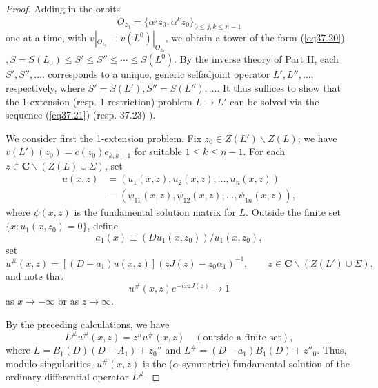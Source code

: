 \documentclass{surv-l}
\theoremstyle{plain}
\theoremstyle{definition}
\numberwithin{equation}{chapter}
\begin{document}
\begin{proof}
Adding in the orbits
\begin{equation*}
O_{z_{0}}=\{\alpha^{j}z_{0}, \alpha^{k}\overline{z}_{0}\}_{0\leq j,k\leq n-1}
\end{equation*}
one at a time, with $v|_{O_{z_{0}}}\equiv v(L^{0})|_{O_{z_{0}}}$, we obtain a tower of the form (\ref{eq37.20})$, S=S(L_{0})\leq S'\leq S''\leq\cdots \leq S(L^{0})$. By the inverse theory of Part II, each $S',S'',\ldots$. corresponds to a unique, generic selfadjoint operator $L',L'',\ldots,$ respectively, where $S'=S(L'),S''=S(L''),\ldots$. It thus suffices to show that the 1-extension (resp. 1-restriction) problem $L\rightarrow L'$ can be solved via the sequence (\ref{eq37.21}) (resp. 37.23) $)$.

We consider first the 1-extension problem. Fix $z_{0}\in Z(L')\backslash Z(L)$; we have $v(L')(z_{0})=c(z_{0})e_{k,k+1}$ for suitable $1\leq k\leq n-1$. For each $z\in \mathbf{C}\backslash (Z(L)\cup\Sigma)$, set
\begin{align*}
u(x, z)&=(u_{1}(x, z),u_{2}(x, z),\ldots, u_{n}(x, z))\\
&\equiv(\psi_{11}(x,z), \psi_{12}(x, z),\ldots,\psi_{1n}(x, z)),
\end{align*}
where $\psi(x, z)$ is the fundamental solution matrix for $L$. Outside the finite set $\{x:u_{1}(x, z_{0})=0\}$, define
\begin{equation}\label{eq37.24}
a_{1}(x)\equiv(Du_{1}(x, z_{0}))/u_{1}(x, z_{0}),
\end{equation}
set
\begin{equation*}
u^{\#}(x,z)=[(D-a_{1})u(x, z)](zJ(z)-z_{0}\alpha_{1})^{-1},\qquad z\in \mathbf{C}\backslash (Z(L')\cup\Sigma),
\end{equation*}
and note that
\begin{equation*}
u^{\#}(x, z)e^{-ixzJ(z)}\rightarrow 1
\end{equation*}
as $x\rightarrow-\infty$ or as $z\rightarrow\infty$.

By the preceding calculations, we have
\begin{equation}\label{eq37.25}
L^{\#}u^{\#}(x,z)=z^{n}u^{\#}(x,z)\quad (\text{outside a finite set}),
\end{equation}
where $L=B_{1}(D)(D-A_{1})+z_{0}''$ and $L^{\#} =(D-a_{1})B_{1}(D)+z''_{0}$. Thus, modulo singularities, $u^{\#}(x,z)$ is the ($\alpha$-symmetric) fundamental solution of the ordinary differential operator $L^{\#}$.


\end{proof}
\end{document}
